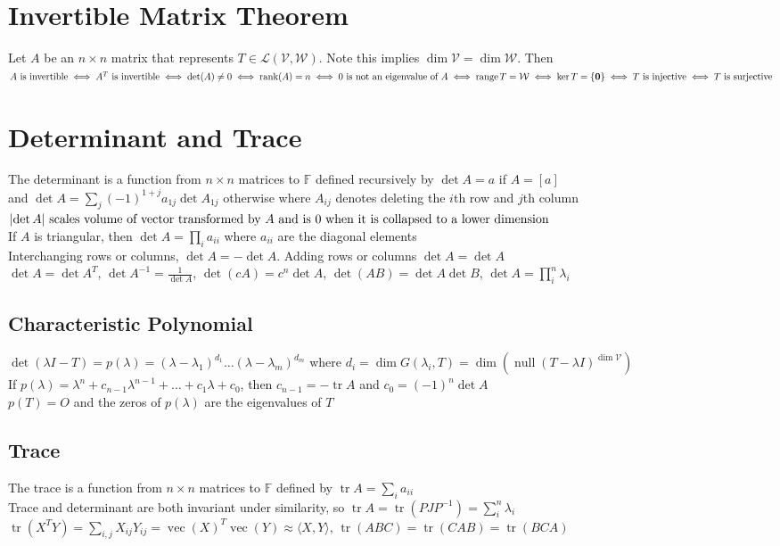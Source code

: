 \documentclass{article}
\DeclarePairedDelimiter\abs{\lvert}{\rvert}%
\DeclareMathOperator{\rank}{rank}
\DeclareMathOperator{\range}{range}
\DeclareMathOperator{\nullspace}{null}
\DeclareMathOperator{\tr}{tr}
\DeclareMathOperator{\vect}{vec}
\newcommand{\F}{\mathbb{F}}
\newcommand{\linear}{\mathcal{L}}
\newcommand{\V}{\mathcal{V}}
\newcommand{\W}{\mathcal{W}}
\newcommand\inner[2]{\langle #1, #2 \rangle}
\begin{document}
\section{Invertible Matrix Theorem}
Let $A$ be an $n \times n$ matrix that represents $T \in \linear(\V, \W)$. Note this implies $\dim \V = \dim \W$. Then \\
$A \mbox{ is invertible} \iff A^T \mbox{ is invertible} \iff \det(A) \neq 0 \iff \rank(A) = n \iff 0 \mbox{ is not an eigenvalue of } A \\ \iff \range T = \W \iff \ker T = \{ \boldsymbol{0} \} \iff T \mbox{ is injective} \iff T \mbox{ is surjective}$

\section{Determinant and Trace}
The determinant is a function from $n \times n$ matrices to $\F$ defined recursively by $\det A = a$ if $A = [a]$ \\ 
and $\det A = \sum_j (-1)^{1+j}a_{1j} \det A_{1j}$ otherwise where $A_{ij}$ denotes deleting the $i$th row and $j$th column \\
$\abs {\det A} \mbox{ scales volume of vector transformed by $A$ and is 0 when it is collapsed to a lower dimension}$ \\
If $A$ is triangular, then $\det A = \prod_i a_{ii}$ where $a_{ii}$ are the diagonal elements \\
Interchanging rows or columns, $\det A = - \det A$. Adding rows or columns $\det A = \det A$ \\
$\det A = \det A^T$, $\det A^{-1} = \frac{1}{\det A}$, $\det (cA) = c^n \det A$, $\det (AB) = \det A \det B$, $\det A = \prod_i^n \lambda_i $ 

\subsection{Characteristic Polynomial}
$\det(\lambda I - T) = p(\lambda) = (\lambda-\lambda_1)^{d_1} \ldots (\lambda-\lambda_m)^{d_m}$ where $d_i = \dim G(\lambda_i, T) = \dim (\nullspace (T- \lambda I)^{\dim \V})$ \\
If $p(\lambda) = \lambda^n + c_{n-1}\lambda^{n-1} + \ldots + c_1\lambda + c_0$, then $c_{n-1} = -\tr A$ and $c_0 = (-1)^n \det A$ \\
$p(T) = O$ and the zeros of $p(\lambda)$ are the eigenvalues of $T$
\subsection{Trace}
The trace is a function from $n \times n$ matrices to $\F$ defined by $\tr A = \sum_i a_{ii}$ \\
Trace and determinant are both invariant under similarity, so $\tr A =  \tr (PJP^{-1}) = \sum_i^n \lambda_i $ \\
$\tr (X^TY) = \sum_{i, j} X_{ij}Y_{ij} = \vect (X)^T \vect(Y) \approx \inner{X}{Y}$, $\tr (ABC) = \tr(CAB) = \tr(BCA)$ 
\end{document}
